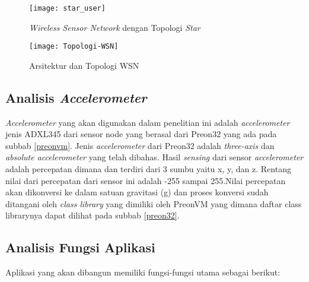 	\begin{figure}[H] 
		\centering  
		\texttt{[image: star\_user]}  
		\caption[\textit{Wireless Sensor Network} dengan Topologi \textit{Star}]{\textit{Wireless Sensor Network} dengan Topologi \textit{Star}}
		\label{fig:star_user} 
	\end{figure}
	
	\begin{figure}[H] 
		\centering  
		\texttt{[image: Topologi-WSN]}  
		\caption[Arsitektur dan Topologi WSN]{Arsitektur dan Topologi WSN}
		\label{fig:topologi_wsn} 
	\end{figure}

\subsection{Analisis \textit{Accelerometer}}
\textit{Accelerometer} yang akan digunakan dalam penelitian ini adalah \textit{accelerometer} jenis ADXL345 dari sensor node yang berasal dari Preon32 yang ada pada subbab \ref{preonvm}. Jenis \textit{accelerometer} dari Preon32 adalah \textit{three-axis} dan \textit{absolute accelerometer} yang telah dibahas. Hasil \textit{sensing} dari sensor \textit{accelerometer} adalah percepatan dimana dan terdiri dari 3 sumbu yaitu x, y, dan z. Rentang nilai dari percepatan dari sensor ini adalah -255 sampai 255.Nilai percepatan akan dikonversi ke dalam satuan gravitasi (g) dan proses konversi sudah ditangani oleh \textit{class library} yang dimiliki oleh PreonVM yang dimana daftar class librarynya dapat dilihat pada subbab \ref{preon32}.

\subsection{Analisis Fungsi Aplikasi}
\label{fungsi}
Aplikasi yang akan dibangun memiliki fungsi-fungsi utama sebagai berikut:

